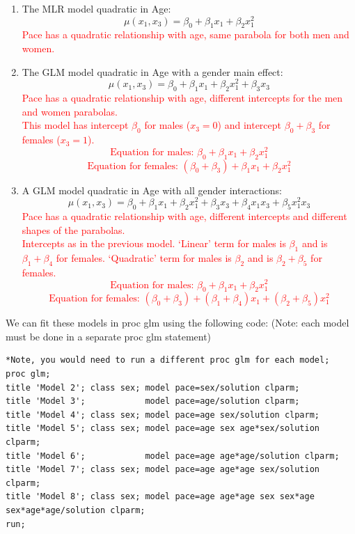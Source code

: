 \begin{enumerate}
\item The MLR model quadratic in Age:
$$\mu(x_1,x_3) = \beta_0 + \beta_1 x_1+ \beta_2 x_1^2 $$%
\textcolor{red}{Pace has a quadratic relationship with age, same parabola for both men and women.}\\
\item The GLM model quadratic in Age with a gender main effect:
$$\mu(x_1,x_3) = \beta_0 + \beta_1 x_1+ \beta_2 x_1^2+ \beta_3 x_3$$%
\textcolor{red}{Pace has a quadratic relationship with age, different intercepts for the men and women parabolas.\\
This model has intercept $\beta_0$ for males ($x_3=0$) and intercept $\beta_0+\beta_3$ for females ($x_3=1$).
$$\mbox{Equation for males: } \beta_0+\beta_1x_1+\beta_2x_1^2$$
$$\mbox{Equation for females: } (\beta_0+\beta_3)+\beta_1x_1+\beta_2x_1^2$$}
\item A GLM model quadratic in Age with all gender interactions:
$$\mu(x_1,x_3) = \beta_0 + \beta_1 x_1+ \beta_2 x_1^2+ \beta_3 x_3 + \beta_4 x_1x_3 + \beta_5x_1^2x_3 $$
\textcolor{red}{Pace has a quadratic relationship with age, different intercepts and different shapes of the parabolas.\\
Intercepts as in the previous model.  `Linear' term for males is $\beta_1$ and is $\beta_1+\beta_4$ for females.  `Quadratic' term for males is $\beta_2$ and is $\beta_2+\beta_5$ for females. 
$$\mbox{Equation for males: } \beta_0+\beta_1x_1+\beta_2x_1^2$$
$$\mbox{Equation for females: } (\beta_0+\beta_3)+(\beta_1+\beta_4)x_1+(\beta_2+\beta_5)x_1^2$$}
\end{enumerate}

\newpage

We can fit these models in proc glm using the following code: (Note: each model must be done in a separate proc glm statement)
\begin{small}
\begin{verbatim}
*Note, you would need to run a different proc glm for each model;
proc glm;  
title 'Model 2'; class sex; model pace=sex/solution clparm;
title 'Model 3';            model pace=age/solution clparm;
title 'Model 4'; class sex; model pace=age sex/solution clparm;
title 'Model 5'; class sex; model pace=age sex age*sex/solution clparm;
title 'Model 6';            model pace=age age*age/solution clparm;
title 'Model 7'; class sex; model pace=age age*age sex/solution clparm;
title 'Model 8'; class sex; model pace=age age*age sex sex*age sex*age*age/solution clparm;
run;
\end{verbatim}
\end{small}

